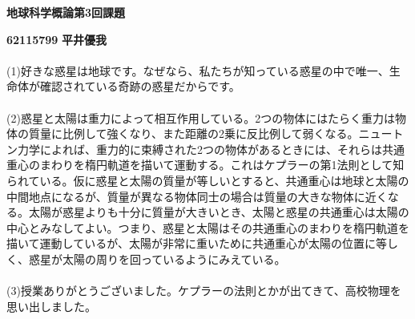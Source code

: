 \documentclass[a4paper,10.5pt]{ltjsarticle}
\begin{document}
\centerline
{\huge \bfseries 地球科学概論第3回課題}
\leftline
{\bfseries 62115799}
{\bfseries 平井優我}\\
\\
(1)好きな惑星は地球です。なぜなら、私たちが知っている惑星の中で唯一、生命体が確認されている奇跡の惑星だからです。\\
\\
(2)惑星と太陽は重力によって相互作用している。2つの物体にはたらく重力は物体の質量に比例して強くなり、また距離の2乗に反比例して弱くなる。ニュートン力学によれば、重力的に束縛された2つの物体があるときには、それらは共通重心のまわりを楕円軌道を描いて運動する。これはケプラーの第1法則として知られている。仮に惑星と太陽の質量が等しいとすると、共通重心は地球と太陽の中間地点になるが、質量が異なる物体同士の場合は質量の大きな物体に近くなる。太陽が惑星よりも十分に質量が大きいとき、太陽と惑星の共通重心は太陽の中心とみなしてよい。つまり、惑星と太陽はその共通重心のまわりを楕円軌道を描いて運動しているが、太陽が非常に重いために共通重心が太陽の位置に等しく、惑星が太陽の周りを回っているようにみえている。\\
\\
(3)授業ありがとうございました。ケプラーの法則とかが出てきて、高校物理を思い出しました。
\end{document}
